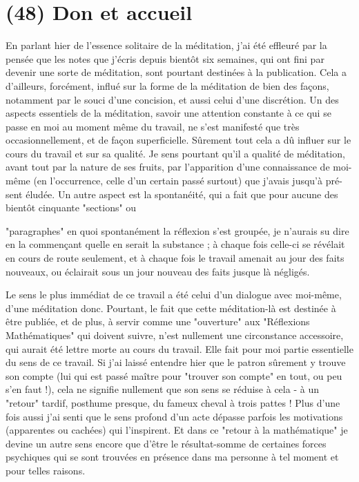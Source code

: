 \section{(48) Don et accueil}

En parlant hier de l'essence solitaire de la méditation, j'ai été effleuré par la pensée que les notes que j’écris depuis bientôt six semaines, qui ont fini par devenir une sorte de méditation, sont pourtant destinées à la publication. Cela a d'ailleurs, forcément, influé sur la forme de la méditation de bien des façons, notamment par le souci d'une concision, et aussi celui d'une discrétion. Un des aspects essentiels de la méditation, savoir une attention constante à ce qui se passe en moi au moment même du travail, ne s'est manifesté que très occasionnellement, et de façon superficielle. Sûrement tout cela a dû influer sur le cours du travail et sur sa qualité. Je sens pourtant qu'il a qualité de méditation, avant tout par la nature de ses fruits, par l'apparition d'une connaissance de moi-même (en l'occurrence, celle d'un certain passé surtout) que j'avais jusqu'à pré- sent éludée. Un autre aspect est la spontanéité, qui a fait que pour aucune des bientôt cinquante "sections" ou

"paragraphes" en quoi spontanément la réflexion s'est groupée, je n'aurais su dire en la commençant quelle en serait la substance ; à chaque fois celle-ci se révélait en cours de route seulement, et à chaque fois le travail amenait au jour des faits nouveaux, ou éclairait sous un jour nouveau des faits jusque là négligés.

Le sens le plus immédiat de ce travail a été celui d'un dialogue avec moi-même, d'une méditation donc. Pourtant, le fait que cette méditation-là est destinée à être publiée, et de plus, à servir comme une "ouverture" aux "Réflexions Mathématiques" qui doivent suivre, n'est nullement une circonstance accessoire, qui aurait été lettre morte au cours du travail. Elle fait pour moi partie essentielle du sens de ce travail. Si j’ai laissé entendre hier que le patron sûrement y trouve son compte (lui qui est passé maître pour "trouver son compte" en tout, ou peu s'en faut !), cela ne signifie nullement que son sens se réduise à cela - à un "retour" tardif, posthume presque, du fameux cheval à trois pattes ! Plus d'une fois aussi j'ai senti que le sens profond d'un acte dépasse parfois les motivations (apparentes ou cachées) qui l’inspirent. Et dans ce "retour à la mathématique" je devine un autre sens encore que d'être le résultat-somme de certaines forces psychiques qui se sont trouvées en présence dans ma personne à tel moment et pour telles raisons.


